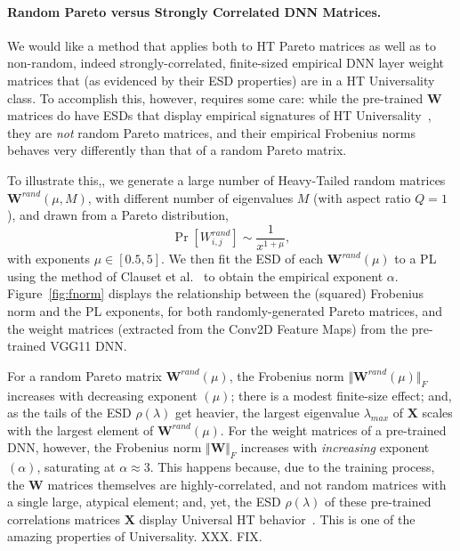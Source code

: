 \paragraph{Random Pareto versus Strongly Correlated DNN Matrices.} 

We would like a method that applies both to HT Pareto matrices as well as to non-random, indeed strongly-correlated, finite-sized empirical DNN layer weight matrices that (as evidenced by their ESD properties) are in a HT Universality class.  
To accomplish this, however, requires some care: while the pre-trained $\mathbf{W}$ matrices do have ESDs that display empirical signatures of HT Universality~\cite{MM18_TR}, they are \emph{not} random Pareto matrices, and their empirical Frobenius norms behaves very differently than that of a random Pareto matrix.  

To illustrate this,, we generate a large number of  Heavy-Tailed  random matrices $\mathbf{W}^{rand}(\mu,M)$, with different number of eigenvalues $M$ (with aspect ratio $Q=1$), and drawn from a Pareto distribution,
$$
\Pr[{W}^{rand}_{i,j}]\sim\dfrac{1}{x^{1+\mu}}  ,
$$
with exponents $\mu\in[0.5, 5]$.
%
We then fit the ESD of each $\mathbf{W}^{rand}(\mu)$ to a PL using the method of Clauset et al.~\cite{CSN09_powerlaw,ABP14} to obtain the empirical exponent $\alpha$.   Figure~\ref{fig:fnorm} displays the relationship between the (squared) Frobenius norm and the PL exponents, for both randomly-generated Pareto matrices, and the weight matrices
(extracted from the Conv2D Feature Maps) from the pre-trained VGG11 DNN.

For a random Pareto matrix $\mathbf{W}^{rand}(\mu)$, the Frobenius norm $\Vert\mathbf{W}^{rand}(\mu)\Vert_{F}$ increases with decreasing exponent $(\mu)$; there is a modest finite-size effect; and, as the tails of the ESD $\rho(\lambda)$ get heavier, the largest eigenvalue $\lambda_{max}$ of $\mathbf{X}$ scales with the largest element of $\mathbf{W}^{rand}(\mu)$. 
For the weight matrices of a pre-trained DNN, however, the Frobenius norm $\Vert\mathbf{W}\Vert_{F}$ increases with \emph{increasing} exponent $(\alpha)$, saturating at $\alpha\approx 3$.
This happens because, due to the training process, the $\mathbf{W}$ matrices themselves are highly-correlated, and not random matrices with a single large, atypical element;   
and, yet, the ESD $\rho(\lambda)$ of these pre-trained correlations matrices $\mathbf{X}$ display Universal HT behavior~\cite{MM18_TR}.
This is one of the amazing properties of Universality.
XXX.  FIX.


